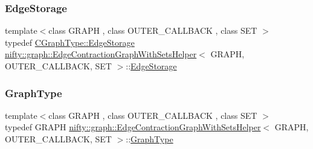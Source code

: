 \mbox{\label{structnifty_1_1graph_1_1EdgeContractionGraphWithSetsHelper_a2378dd6c8e82012a04236593971ac4e7}} 
\subsubsection{\texorpdfstring{Edge\+Storage}{EdgeStorage}}
{\footnotesize\ttfamily template$<$class G\+R\+A\+PH , class O\+U\+T\+E\+R\+\_\+\+C\+A\+L\+L\+B\+A\+CK , class S\+ET $>$ \\
typedef \hyperlink{classnifty_1_1graph_1_1EdgeContractionGraph_ad57e807f7df20892c7bbbb9b53d3aa08}{C\+Graph\+Type\+::\+Edge\+Storage} \hyperlink{structnifty_1_1graph_1_1EdgeContractionGraphWithSetsHelper}{nifty\+::graph\+::\+Edge\+Contraction\+Graph\+With\+Sets\+Helper}$<$ G\+R\+A\+PH, O\+U\+T\+E\+R\+\_\+\+C\+A\+L\+L\+B\+A\+CK, S\+ET $>$\+::\hyperlink{structnifty_1_1graph_1_1EdgeContractionGraphWithSetsHelper_a2378dd6c8e82012a04236593971ac4e7}{Edge\+Storage}}

\mbox{\label{structnifty_1_1graph_1_1EdgeContractionGraphWithSetsHelper_a7f5226bf25f277d906a526db55556cdf}} 
\subsubsection{\texorpdfstring{Graph\+Type}{GraphType}}
{\footnotesize\ttfamily template$<$class G\+R\+A\+PH , class O\+U\+T\+E\+R\+\_\+\+C\+A\+L\+L\+B\+A\+CK , class S\+ET $>$ \\
typedef G\+R\+A\+PH \hyperlink{structnifty_1_1graph_1_1EdgeContractionGraphWithSetsHelper}{nifty\+::graph\+::\+Edge\+Contraction\+Graph\+With\+Sets\+Helper}$<$ G\+R\+A\+PH, O\+U\+T\+E\+R\+\_\+\+C\+A\+L\+L\+B\+A\+CK, S\+ET $>$\+::\hyperlink{structnifty_1_1graph_1_1EdgeContractionGraphWithSetsHelper_a7f5226bf25f277d906a526db55556cdf}{Graph\+Type}}

